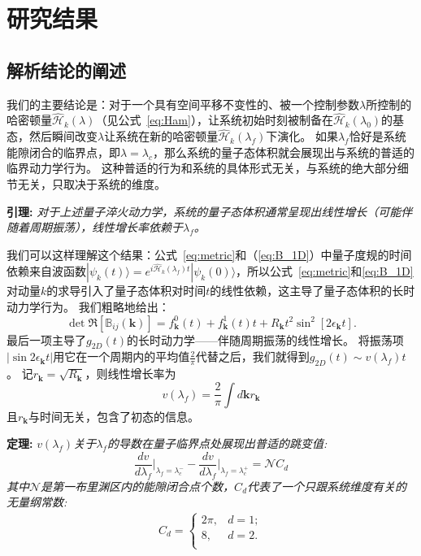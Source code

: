 	\section{研究结果}
	
		\subsection{解析结论的阐述}

			我们的主要结论是：对于一个具有空间平移不变性的、被一个控制参数$\lambda$所控制的哈密顿量$\hat{\mathcal{H}}_k(\lambda)$（见公式~\eqref{eq:Ham}），让系统初始时刻被制备在$\hat{\mathcal{H}}_k(\lambda_0)$的基态，然后瞬间改变$\lambda$让系统在新的哈密顿量$\hat{\mathcal{H}}_k(\lambda_f)$下演化。
			如果$\lambda_f$恰好是系统能隙闭合的临界点，即$\lambda=\lambda_c$，那么系统的量子态体积就会展现出与系统的普适的临界动力学行为。
			这种普适的行为和系统的具体形式无关，与系统的绝大部分细节无关，只取决于系统的维度。
			
			{\bf 引理:}
			\textit{对于上述量子淬火动力学，系统的量子态体积通常呈现出线性增长（可能伴随着周期振荡），线性增长率依赖于$\lambda_f$。}
			
			我们可以这样理解这个结果：公式~\ref{eq:metric}和（\ref{eq:B_1D}）中量子度规的时间依赖来自波函数$|\psi_k(t)\rangle=e^{i\hat{\mathcal{H}}_k(\lambda_f)t}|\psi_k(0)\rangle$，所以公式~\ref{eq:metric}和\ref{eq:B_1D}对动量$k$的求导引入了量子态体积对时间$t$的线性依赖，这主导了量子态体积的长时动力学行为。
			我们粗略地给出：
			\begin{equation}
				\det{\Re[\mathbb{B}_{ij}(\mathbf{k})]} = f_\mathbf{k}^0(t)+f_\mathbf{k}^1(t) t+R_\mathbf{k} t^2\sin^2[2 \epsilon_\mathbf{k} t]. \label{eq:Rk}
			\end{equation}
			最后一项主导了$g_{2D}(t)$的长时动力学——伴随周期振荡的线性增长。
			将振荡项$|\sin2\epsilon_{\mathbf{k}}t|$用它在一个周期内的平均值$\frac 2\pi$代替之后，我们就得到$g_{2D}(t)\sim v(\lambda_f)t$。
			记$r_\mathbf{k} = \sqrt{R_{\mathbf{k}}}$，则线性增长率为
			\begin{equation}\label{Eq:v}
				v(\lambda_f)=\frac 2\pi\int d\mathbf{k}r_\mathbf{k}
			\end{equation}
			且$r_{\mathbf{k}}$与时间无关，包含了初态的信息。
			
			{\bf 定理:}
			\textit{$v(\lambda_f)$关于$\lambda_f$的导数在量子临界点处展现出普适的跳变值:
				\begin{equation}\label{eq:Cd}
					\frac{dv}{d\lambda_f}\bigg |_{\lambda_f=\lambda_c^-} - \frac{dv}{d\lambda_f}\bigg |_{\lambda_f=\lambda_c^+} = \mathcal{N} C_d
				\end{equation}
				其中$\mathcal{N}$是第一布里渊区内的能隙闭合点个数，$C_d$代表了一个只跟系统维度有关的无量纲常数:
				\begin{eqnarray}\label{eq:cd}
					C_d = \left\{\begin{array}{cl}
						2\pi, & d=1;   \\
						8, & d=2. \\
					\end{array}\right.
				\end{eqnarray}
			}
		
